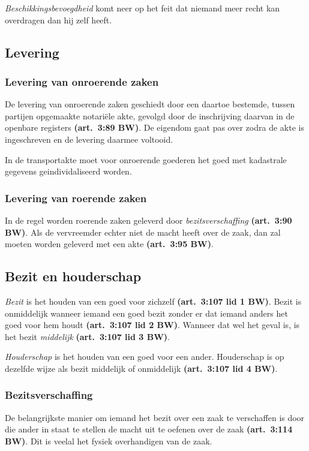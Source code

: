 \documentclass[a4paper]{article}
\newcommand{\art}[1]{\textbf{(art.~#1 BW)}\xspace}
\begin{document}
\emph{Beschikkingsbevoegdheid} komt neer op het feit dat niemand meer recht
kan overdragen dan hij zelf heeft.

\subsection{Levering}

\subsubsection{Levering van onroerende zaken}

De levering van onroerende zaken geschiedt door een daartoe bestemde, tussen
partijen opgemaakte notari\"ele akte, gevolgd door de inschrijving daarvan in
de openbare registers \art{3:89}. De eigendom gaat pas over zodra de akte is
ingeschreven en de levering daarmee voltooid.

In de transportakte moet voor onroerende goederen het goed met kadastrale
gegevens geindividaliseerd worden.

\subsubsection{Levering van roerende zaken}

In de regel worden roerende zaken geleverd door \emph{bezitsverschaffing}
\art{3:90}. Als de vervreemder echter niet de macht heeft over de zaak, dan
zal moeten worden geleverd met een akte \art{3:95}.

\subsection{Bezit en houderschap}

\emph{Bezit} is het houden van een goed voor zichzelf \art{3:107 lid 1}. Bezit
is onmiddelijk wanneer iemand een goed bezit zonder er dat iemand anders het
goed voor hem houdt \art{3:107 lid 2}. Wanneer dat wel het geval is, is het
bezit \emph{middelijk} \art{3:107 lid 3}.

\emph{Houderschap} is het houden van een goed voor een ander. Houderschap is
op dezelfde wijze als bezit middelijk of onmiddelijk \art{3:107 lid 4}.

\subsubsection{Bezitsverschaffing}

De belangrijkste manier om iemand het bezit over een zaak te verschaffen is
door die ander in staat te stellen de macht uit te oefenen over de zaak
\art{3:114}. Dit is veelal het fysiek overhandigen van de zaak.
\end{document}
